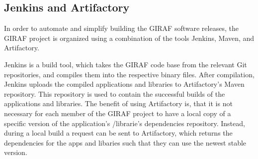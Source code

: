 \subsection{Jenkins and Artifactory}
In order to automate and simplify building the GIRAF software releases, the
GIRAF project is organized using a combination of the tools Jenkins, Maven, and
Artifactory.\nl

Jenkins is a build tool, which takes the GIRAF code base from the relevant Git
repositories, and compiles them into the respective binary files. After
compilation, Jenkins uploads the compiled applications and libraries to
Artifactory's Maven repository. This repository is used to contain the
successful builds of the applications and libraries. The benefit of using
Artifactory is, that it is not necessary for each member of the GIRAF project to
have a local copy of a specific version of the application's /librarie's
dependencies repository.
Instead, during a local build a request can be sent to Artifactory, which
returns the dependencies for the apps and libaries such that they can use the newest stable version.


